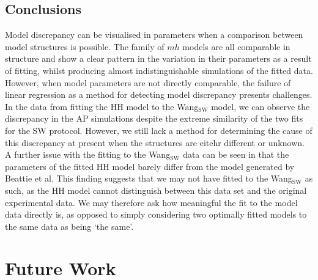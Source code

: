 \documentclass[11pt,a4paper,oneside]{article}
\begin{document}
\begin{table}
\caption{RMSE for $mh$ models}
\centering
{}
\label{Tab_RMSE_mh}
\end{table}

\subsection{Conclusions}

Model discrepancy can be visualised in parameters when a comparison between model structures is possible. The family of $mh$ models are all comparable in structure and show a clear pattern in the variation in their parameters as a result of fitting, whilst producing almost indistinguishable simulations of the fitted data. However, when model parameters are not directly comparable, the failure of linear regression as a method for detecting model discrepancy presents challenges. In the data from fitting the HH model to the Wang$_\text{SW}$ model, we can observe the discrepancy in the AP simulations despite the extreme similarity of the two fits for the SW protocol. However, we still lack a method for determining the cause of this discrepancy at present when the structures are eitehr different or unknown. A further issue with the fitting to the Wang$_\text{SW}$ data can be seen in that the parameters of the fitted HH model barely differ from the model generated by Beattie et al. This finding suggests that we may not have fitted to the Wang$_\text{SW}$ as such, as the HH model cannot distinguish between this data set and the original experimental data. We may therefore ask how meaningful the fit to the model data directly is, as opposed to simply considering two optimally fitted models to the same data as being `the same'.

\clearpage

\section{Future Work}\label{Sec_FutureWork}
\end{document}
